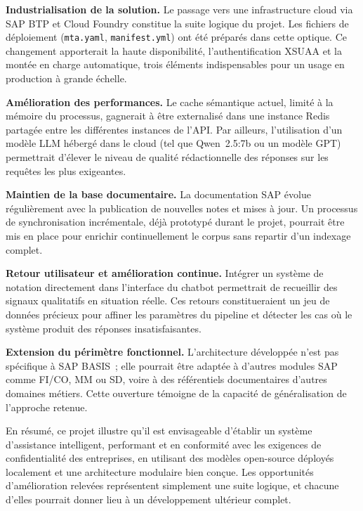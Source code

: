 \textbf{Industrialisation de la solution.} Le passage vers une infrastructure cloud via SAP BTP et Cloud Foundry constitue la suite logique du projet. Les fichiers de déploiement (\texttt{mta.yaml}, \texttt{manifest.yml}) ont été préparés dans cette optique. Ce changement apporterait la haute disponibilité, l'authentification XSUAA et la montée en charge automatique, trois éléments indispensables pour un usage en production à grande échelle.

\textbf{Amélioration des performances.} Le cache sémantique actuel, limité à la mémoire du processus, gagnerait à être externalisé dans une instance Redis partagée entre les différentes instances de l'API. Par ailleurs, l'utilisation d'un modèle LLM hébergé dans le cloud (tel que Qwen~2.5:7b ou un modèle GPT) permettrait d'élever le niveau de qualité rédactionnelle des réponses sur les requêtes les plus exigeantes.

\textbf{Maintien de la base documentaire.} La documentation SAP évolue régulièrement avec la publication de nouvelles notes et mises à jour. Un processus de synchronisation incrémentale, déjà prototypé durant le projet, pourrait être mis en place pour enrichir continuellement le corpus sans repartir d'un indexage complet.

\textbf{Retour utilisateur et amélioration continue.} Intégrer un système de notation directement dans l'interface du chatbot permettrait de recueillir des signaux qualitatifs en situation réelle. Ces retours constitueraient un jeu de données précieux pour affiner les paramètres du pipeline et détecter les cas où le système produit des réponses insatisfaisantes.

\textbf{Extension du périmètre fonctionnel.} L'architecture développée n'est pas spécifique à SAP BASIS~; elle pourrait être adaptée à d'autres modules SAP comme FI/CO, MM ou SD, voire à des référentiels documentaires d'autres domaines métiers. Cette ouverture témoigne de la capacité de généralisation de l'approche retenue.

En résumé, ce projet illustre qu'il est envisageable d'établir un système d'assistance intelligent, performant et en conformité avec les exigences de confidentialité des entreprises, en utilisant des modèles open-source déployés localement et une architecture modulaire bien conçue. Les opportunités d'amélioration relevées représentent simplement une suite logique, et chacune d'elles pourrait donner lieu à un développement ultérieur complet.

